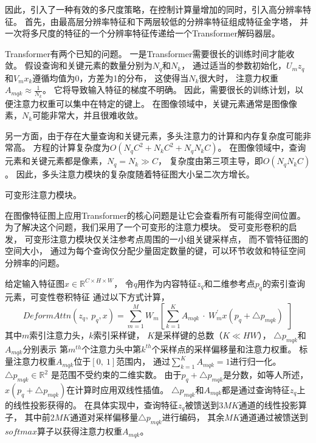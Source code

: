 因此，引入了一种有效的多尺度策略，在控制计算量增加的同时，引入高分辨率特征。
首先，由最高层分辨率特征和下两层较低的分辨率特征组成特征金字塔，
并一次将多尺度的特征的一个分辨率特征传递给一个Transformer解码器层。
\par
% 
% 





Transformer有两个已知的问题。
一是Transformer需要很长的训练时间才能收敛。
假设查询和关键元素的数量分别为$N_{q}$和$N_{k}$，
通过适当的参数初始化，$U_{m}z_{q}$和$ V_{m}x_{k}$遵循均值为0，方差为1的分布，
这使得当$N_{k}$很大时，
注意力权重$A_{mqk} \approx \frac{1}{N_{k}} $。
它将导致输入特征的梯度不明确。
因此，需要很长的训练计划，以便注意力权重可以集中在特定的键上。
在图像领域中，关键元素通常是图像像素，$N_{k}$可能非常大，并且很难收敛。
% 
% 
% 
% 
\par
%
% 
% 
% 
另一方面，由于存在大量查询和关键元素，多头注意力的计算和内存复杂度可能非常高。
方程的计算复杂度为$O\left ( N_{q}C^{2} + N_{k}C^{2}+N_{q}N_{k}C \right ) $。
在图像领域中，查询元素和关键元素都是像素，$N_{q}=N_{k} \gg C$，
复杂度由第三项主导，即$O(N_{q}N_{k}C) $。
因此，多头注意力模块的复杂度随着特征图大小呈二次方增长。


可变形注意力模块。

在图像特征图上应用Transformer的核心问题是让它会查看所有可能得空间位置。
为了解决这个问题，我们采用了一个可变形的注意力模块。
受可变形卷积的启发，
可变形注意力模块仅关注参考点周围的一小组关键采样点，
而不管特征图的空间大小，
通过为每个查询仅分配少量固定数量的键，可以环节收敛和特征空间分辨率的问题。


给定输入特征图$x \in \mathbb{R}^{C\times H \times W}$，
令$q$用作为内容特征$z_{q}$和二维参考点$p_{q}$的索引查询元素，可变性卷积特征
通过以下方式计算，
% 
% 
% 
% 
\begin{equation}
	DeformAttn(z_{q},~p_{q},x)=
	\sum_{m=1}^{M}
	W_{m}\left [ 
	\sum_{k=1}^{K}A_{mqk}~\cdot~
	W_{m}^{'}x\left ( p_{q} + \bigtriangleup p_{mqk} \right ) 
	~~\right ]  
\end{equation}
% 
% 
% 
% 
其中$m$索引注意力头，$k$索引采样键，
$K$是采样键的总数（$K \ll HW$），
$\bigtriangleup p_{mqk} $和$A_{mqk}$分别表示
第$m^{th}$个注意力头中第$k^{th}$个采样点的采样偏移量和注意力权重。
标量注意力权重$A_{mqk}$位于$\left [ 0,~1 \right ] $范围内，
通过$ {\textstyle \sum_{k=1}^{K}} A_{mqk}=1$进行归一化。
$\bigtriangleup p_{mqk} \in \mathbb{R}^{2}$
是范围不受约束的二维实数。
由于$p_{q} + \bigtriangleup p_{mqk}$是分数，如等人所述，
$x\left ( p_{q} + \bigtriangleup p_{mqk} \right ) $在计算时应用双线性插值。
$\bigtriangleup p_{mqk}   $和$A_{mqk}$都是通过查询特征$z_{q}$上的线性投影获得的。
在具体实现中，查询特征$z_{q}$被馈送到$3MK$通道的线性投影算子，
其中前$2MK$通道对采样偏移量$\bigtriangleup p_{mqk}$进行编码，
其余$MK$通道通过被馈送到$softmax$算子以获得注意力权重$A_{mqk}$。





